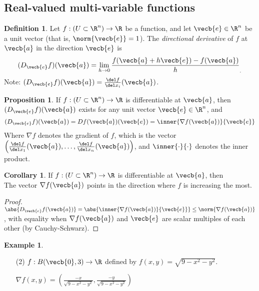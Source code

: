 \documentclass[a5paper]{article}
\theoremstyle{definition}%
\newtheorem{corollary}[theorem]{Corollary}
\newtheorem{proposition}[theorem]{Proposition}
\newtheorem*{definition*}{Definition}
\newtheorem*{example*}{Example}
\numberwithin{exercise}{section}
\theoremstyle{remark}%
\begin{document}
\subsection{Real-valued multi-variable functions}

\begin{highlight}
\begin{definition*}
Let $f:(U\subset\R^n)\to\R$ be a function, and let $\vecb{e}\in \R^n$ be a unit vector (that is, $\norm{\vecb{e}}=1$). The \emph{directional derivative}  of $f$ at $\vecb{a}$ in the direction $\vecb{e}$ is
$$(D_\vecb{e}f)(\vecb{a})=\lim_{h\to0} \frac{f(\vecb{a}+h\vecb{e})-f(\vecb{a})}{h}_.$$
Note: $(D_\vecb{e}f)(\vecb{a})=\frac{\del f}{\del x_i}(\vecb{a})$. 
\end{definition*}
\end{highlight}

\begin{highlight}
\begin{proposition}
If $f:(U\subset\R^n)\to\R$ is differentiable at $\vecb{a}$, then \\
$(D_\vecb{e}f)(\vecb{a})$ exists for any unit vector $\vecb{e}\in \R^n$, and 
$$(D_\vecb{e}f)(\vecb{a})=Df(\vecb{a})(\vecb{e})=\inner{\nabla f(\vecb{a})}{\vecb{e}}$$
Where $\nabla f$ denotes the gradient of $f$, which is the vector $\left(\frac{\del f}{\del x_1}(\vecb{a}), \ldots, \frac{\del f}{\del x_n}(\vecb{a})\right)$, and $\inner{\cdot}{\cdot}$ denotes the inner product. 
\end{proposition}
\end{highlight}

\begin{highlight}
\begin{corollary}
If $f:(U\subset\R^n)\to\R$ is differentiable at $\vecb{a}$, then \\
The vector $\nabla f(\vecb{a})$ points in the direction where $f$ is increasing the most.
\end{corollary}
\end{highlight}
\begin{proof}
$\abs{D_\vecb{e}f(\vecb{a})}=\abs{\inner{\nabla f(\vecb{a})}{\vecb{e}}}\leq \norm{\nabla f(\vecb{a})}$, with equality when $\nabla f(\vecb{a})$ and $\vecb{e}$ are scalar multiples of each other (by Cauchy-Schwarz). 
\end{proof}

\begin{example*}\mbox{}
\begin{enumerate}
\item[(2)] $f:B(\vecb{0},3)\to \R$ defined by $f(x,y)=\sqrt{9-x^2-y^2}$. 

$\nabla f(x,y)=\left(\frac{-x}{\sqrt{9-x^2-y^2}}, \frac{-y}{\sqrt{9-x^2-y^2}}\right)$

\end{enumerate}
\end{example*}
\end{document}
